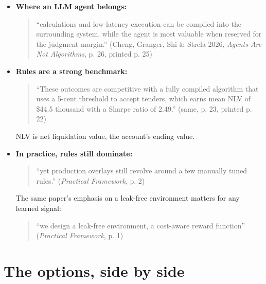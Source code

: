 \documentclass{article}
\begin{document}
\begin{itemize}

\item \textbf{Where an LLM agent belongs:}

\begin{quote}``calculations and low-latency execution can be compiled into the surrounding system, while the agent is most valuable when reserved for the judgment margin.'' (Cheng, Granger, Shi \& Strela 2026, \emph{Agents Are Not Algorithms}, p. 26, printed p. 25)\end{quote}

\item \textbf{Rules are a strong benchmark:}

\begin{quote}``These outcomes are competitive with a fully compiled algorithm that uses a 5-cent threshold to accept tenders, which earns mean NLV of \$44.5 thousand with a Sharpe ratio of 2.49.'' (same, p. 23, printed p. 22)\end{quote}

NLV is net liquidation value, the account's ending value.

\item \textbf{In practice, rules still dominate:}

\begin{quote}``yet production overlays still revolve around a few manually tuned rules.'' (\emph{Practical Framework}, p. 2)\end{quote}

The same paper's emphasis on a leak-free environment matters for any learned signal:

\begin{quote}``we design a leak-free environment, a cost-aware reward function'' (\emph{Practical Framework}, p. 1)\end{quote}

\end{itemize}

\section{The options, side by side}
\end{document}
